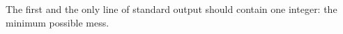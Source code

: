 The first and the only line of standard output should contain one integer: the minimum possible mess.
